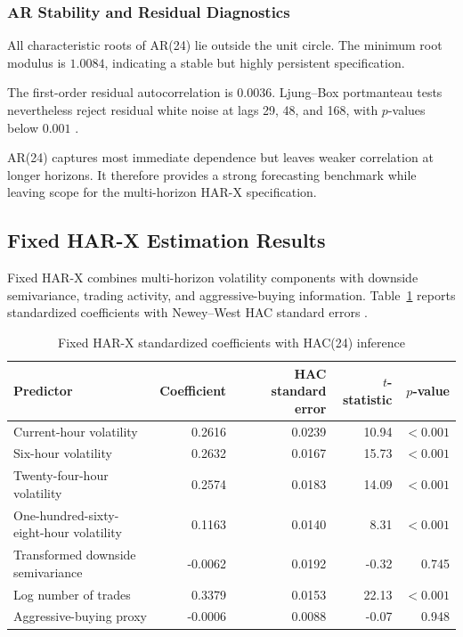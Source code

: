 \subsubsection{AR Stability and Residual Diagnostics}

All characteristic roots of AR(24) lie outside the unit
circle. The minimum root modulus is \(1.0084\), indicating a
stable but highly persistent specification.

The first-order residual autocorrelation is \(0.0036\).
Ljung--Box portmanteau tests nevertheless reject residual white
noise at lags 29, 48, and 168, with \(p\)-values below
\(0.001\) \citep{ljungbox1978}.

AR(24) captures most immediate dependence but leaves weaker
correlation at longer horizons. It therefore provides a strong
forecasting benchmark while leaving scope for the
multi-horizon HAR-X specification.

\subsection{Fixed HAR-X Estimation Results}

Fixed HAR-X combines multi-horizon volatility components with
downside semivariance, trading activity, and aggressive-buying
information. Table~\ref{tab:fixed-harx-coefficients} reports
standardized coefficients with Newey--West HAC standard errors
\citep{neweywest1987}.

\begin{table}[H]
\centering
\caption{
Fixed HAR-X standardized coefficients with HAC(24) inference
}
\label{tab:fixed-harx-coefficients}
\scriptsize
\begin{tabular}{p{5.7cm}rrrr}
\toprule
Predictor
& Coefficient
& HAC standard error
& \(t\)-statistic
& \(p\)-value \\
\midrule
Current-hour volatility
& 0.2616
& 0.0239
& 10.94
& \(<0.001\) \\

Six-hour volatility
& 0.2632
& 0.0167
& 15.73
& \(<0.001\) \\

Twenty-four-hour volatility
& 0.2574
& 0.0183
& 14.09
& \(<0.001\) \\

One-hundred-sixty-eight-hour volatility
& 0.1163
& 0.0140
& 8.31
& \(<0.001\) \\

Transformed downside semivariance
& -0.0062
& 0.0192
& -0.32
& 0.745 \\

Log number of trades
& 0.3379
& 0.0153
& 22.13
& \(<0.001\) \\

Aggressive-buying proxy
& -0.0006
& 0.0088
& -0.07
& 0.948 \\
\bottomrule
\end{tabular}
\end{table}

